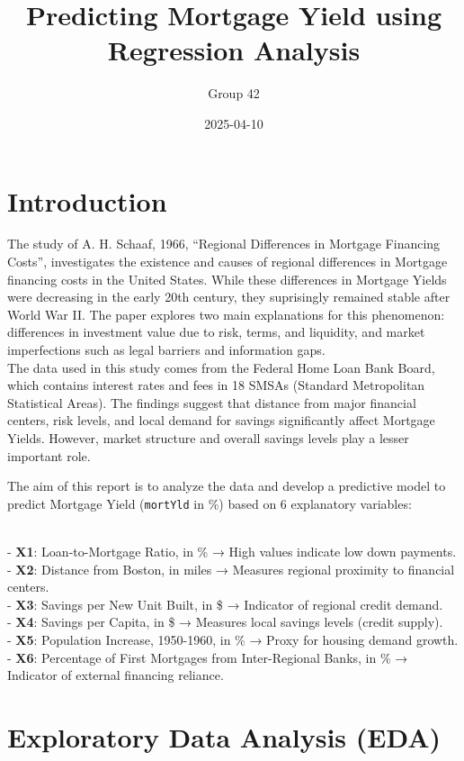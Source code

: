 \documentclass[
  11pt,
]{article}
\title{\textbf{Predicting Mortgage Yield using Regression Analysis}}
\author{Group 42}
\date{2025-04-10}
\begin{document}
\maketitle

\section{Introduction}\label{introduction}

The study of A. H. Schaaf, 1966, ``Regional Differences in Mortgage
Financing Costs'', investigates the existence and causes of regional
differences in Mortgage financing costs in the United States. While
these differences in Mortgage Yields were decreasing in the early 20th
century, they suprisingly remained stable after World War II. The paper
explores two main explanations for this phenomenon: differences in
investment value due to risk, terms, and liquidity, and market
imperfections such as legal barriers and information gaps.\\

The data used in this study comes from the Federal Home Loan Bank Board,
which contains interest rates and fees in 18 SMSAs (Standard
Metropolitan Statistical Areas). The findings suggest that distance from
major financial centers, risk levels, and local demand for savings
significantly affect Mortgage Yields. However, market structure and
overall savings levels play a lesser important role.

The aim of this report is to analyze the data and develop a predictive
model to predict Mortgage Yield (\texttt{mortYld} in \%) based on 6
explanatory variables:\\
\strut \\
- \textbf{X1}: Loan-to-Mortgage Ratio, in \% → High values indicate low
down payments.\\
- \textbf{X2}: Distance from Boston, in miles → Measures regional
proximity to financial centers.\\
- \textbf{X3}: Savings per New Unit Built, in \$ → Indicator of regional
credit demand.\\
- \textbf{X4}: Savings per Capita, in \$ → Measures local savings levels
(credit supply).\\
- \textbf{X5}: Population Increase, 1950-1960, in \% → Proxy for housing
demand growth.\\
- \textbf{X6}: Percentage of First Mortgages from Inter-Regional Banks,
in \% → Indicator of external financing reliance.

\section{Exploratory Data Analysis
(EDA)}\label{exploratory-data-analysis-eda}
\end{document}
